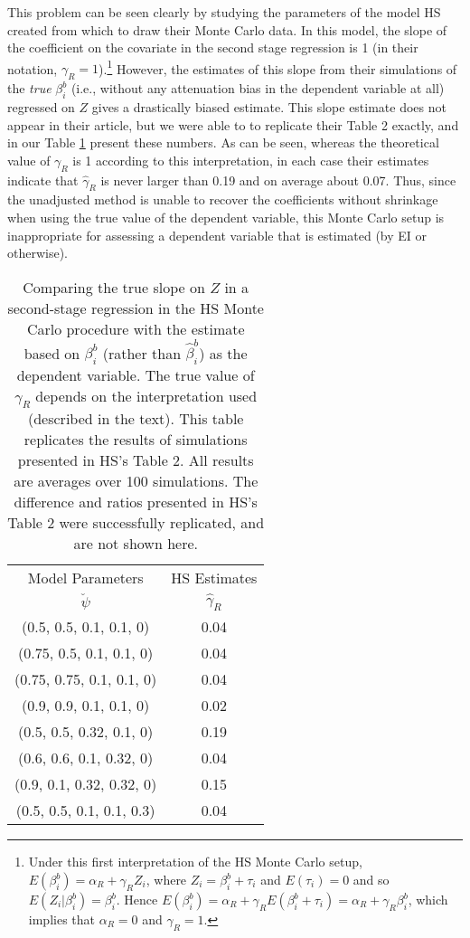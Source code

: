 \documentclass[11pt,titlepage]{article}
\begin{document}
This problem can be seen clearly by studying the parameters of the
model HS created from which to draw their Monte Carlo data.  In this
model, the slope of the coefficient on the covariate in the second
stage regression is 1 (in their notation,
$\gamma_R=1$).\footnote{Under this first interpretation of the HS
  Monte Carlo setup, $E(\beta_i^b)=\alpha_R+\gamma_R Z_i$, where
  $Z_i=\beta_i^b+\tau_i$ and $E(\tau_i)=0$ and so
  $E(Z_i|\beta_i^b)=\beta_i^b$.  Hence
  $E(\beta_i^b)=\alpha_R+\gamma_RE(\beta_i^b+\tau_i) =
  \alpha_R+\gamma_R\beta_i^b$, which implies that $\alpha_R=0$ and
  $\gamma_R=1$.}  However, the estimates of this slope from their
simulations of the \emph{true} $\beta_i^b$ (i.e., without any
attenuation bias in the dependent variable at all) regressed on $Z$
gives a drastically biased estimate.  This slope estimate does not
appear in their article, but we were able to to replicate their Table
2 exactly, and in our Table \ref{t:hsrep} present these numbers.  As
can be seen, whereas the theoretical value of $\gamma_R$ is 1
according to this interpretation, in each case their estimates
indicate that $\hat\gamma_R$ is never larger than 0.19 and on average
about 0.07.  Thus, since the unadjusted method is unable to recover
the coefficients without shrinkage when using the true value of the
dependent variable, this Monte Carlo setup is inappropriate for
assessing a dependent variable that is estimated (by EI or otherwise).
\begin{table}[tb]
\label{t:hsrep}
\begin{center}
\begin{tabular}{c|c}
Model Parameters & \multicolumn{1}{c}{HS Estimates} \\
$\breve\psi$  &  $\hat\gamma_R$ \\\hline
(0.5, 0.5, 0.1, 0.1, 0)        &       0.04\\  
(0.75, 0.5, 0.1, 0.1, 0)       &       0.04  \\
(0.75, 0.75, 0.1, 0.1, 0)      &       0.04  \\
(0.9, 0.9, 0.1, 0.1, 0)        &       0.02  \\
(0.5, 0.5, 0.32, 0.1, 0)       &       0.19  \\
(0.6, 0.6, 0.1, 0.32, 0)       &       0.04  \\
(0.9, 0.1, 0.32, 0.32, 0)      &       0.15  \\
(0.5, 0.5, 0.1, 0.1, 0.3)      &       0.04  \\
\hline
\end{tabular}
\end{center}
\caption{Comparing the true slope on $Z$ in a 
second-stage regression in the HS Monte Carlo 
procedure with the estimate based on $\beta_i^b$ 
(rather than $\hat\beta_i^b$) as the dependent variable.  The true
value of $\gamma_R$ depends on the interpretation used (described in
the text).  This table replicates the results of simulations presented in
HS's Table 2.  All results are averages over 100 simulations.  
The difference and ratios presented in HS's Table 2 were  
successfully replicated, and are not shown here.}
\end{table}
\end{document}
